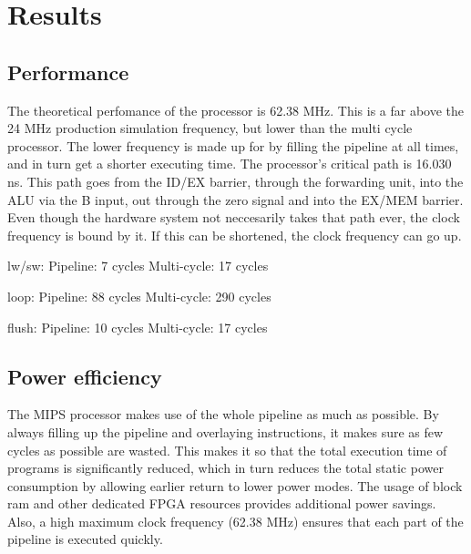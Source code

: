 \section{Results}

\subsection{Performance}

The theoretical perfomance of the processor is 62.38 MHz.
This is a far above the 24 MHz production simulation frequency, but lower than the multi cycle processor.
The lower frequency is made up for by filling the pipeline at all times, and in turn get a shorter executing time.
The processor's critical path is 16.030 ns.
This path goes from the ID/EX barrier, through the forwarding unit, into the ALU via the B input, out through the zero signal and into the EX/MEM barrier.
Even though the hardware system not neccesarily takes that path ever, the clock frequency is bound by it.
If this can be shortened, the clock frequency can go up.


lw/sw:
Pipeline: 7 cycles
Multi-cycle: 17 cycles

loop:
Pipeline: 88 cycles
Multi-cycle: 290 cycles

flush:
Pipeline: 10 cycles
Multi-cycle: 17 cycles

\subsection{Power efficiency}

The MIPS processor makes use of the whole pipeline as much as possible.
By always filling up the pipeline and overlaying instructions, it makes sure as few cycles as possible are wasted.
This makes it so that the total execution time of programs is significantly reduced, which in turn reduces the total static power consumption by allowing earlier return to lower power modes.
The usage of block ram and other dedicated FPGA resources provides additional power savings.
Also, a high maximum clock frequency (62.38 MHz) ensures that each part of the pipeline is executed quickly.

